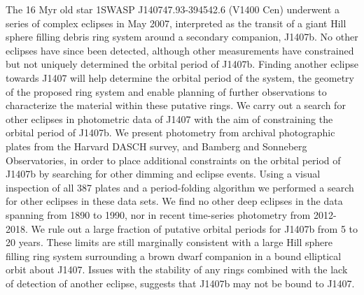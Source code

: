 \documentclass[twocolumn]{aa}
\begin{document}
   \date{Received 03 August 2018; accepted 04 September 2018}

  \abstract
   {The 16 Myr old star 1SWASP J140747.93-394542.6 (V1400 Cen) underwent a series of complex eclipses in May 2007, interpreted as the transit of a giant Hill sphere filling debris ring system around a secondary companion, J1407b.
   No other eclipses have since been detected, although other measurements have constrained but not uniquely determined the orbital period of J1407b.
   Finding another eclipse towards J1407 will help determine the orbital period of the system, the geometry of the proposed ring system and enable planning of further observations to characterize the material within these putative rings.}
   {We carry out a search for other eclipses in photometric data of J1407 with the aim of constraining the orbital period of J1407b.}
   {We present photometry from archival photographic plates from the Harvard DASCH survey, and Bamberg and Sonneberg Observatories, in order to place additional constraints on the orbital period of J1407b by searching for other dimming and eclipse events.
   Using a visual inspection of all 387 plates and a period-folding algorithm we performed a search for other eclipses in these data sets.}
   {We find no other deep eclipses in the data spanning from 1890 to 1990, nor in recent time-series photometry from 2012-2018.}
   {We rule out a large fraction of putative orbital periods for J1407b from 5 to 20 years.
   These limits are still marginally consistent with a large Hill sphere filling ring system surrounding a brown dwarf companion in a bound elliptical orbit about J1407.
   Issues with the stability of any rings combined with the lack of detection of another eclipse, suggests that J1407b may not be bound to J1407.}
%
\setlength{\headheight}{20pt}
   \maketitle
   
\end{document}
